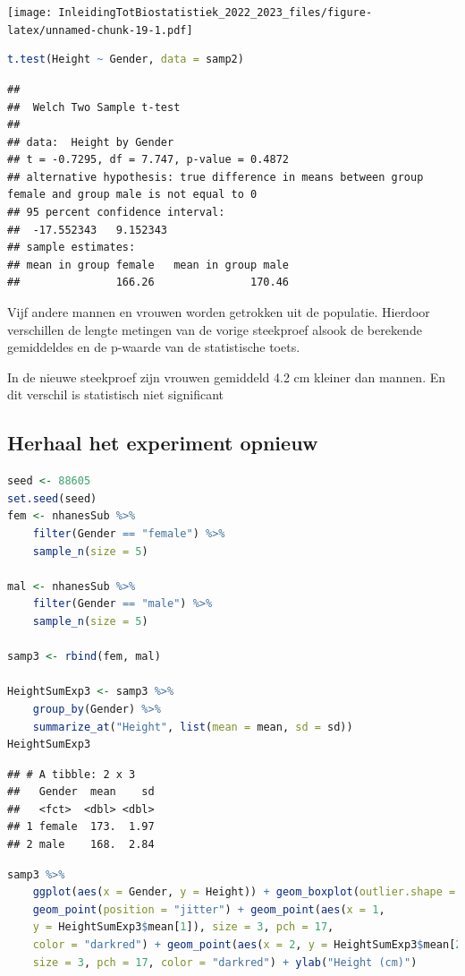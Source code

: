 \documentclass[
  12pt,dutch,coursenotes]{book}
\begin{document}
\texttt{[image: InleidingTotBiostatistiek\_2022\_2023\_files/figure-latex/unnamed-chunk-19-1.pdf]}

\begin{lstlisting}[language=R]
t.test(Height ~ Gender, data = samp2)
\end{lstlisting}

\begin{lstlisting}
## 
##  Welch Two Sample t-test
## 
## data:  Height by Gender
## t = -0.7295, df = 7.747, p-value = 0.4872
## alternative hypothesis: true difference in means between group female and group male is not equal to 0
## 95 percent confidence interval:
##  -17.552343   9.152343
## sample estimates:
## mean in group female   mean in group male 
##               166.26               170.46
\end{lstlisting}

Vijf andere mannen en vrouwen worden getrokken uit de populatie. Hierdoor verschillen de lengte metingen van de vorige steekproef alsook de berekende gemiddeldes en de p-waarde van de statistische toets.

In de nieuwe steekproef zijn vrouwen gemiddeld 4.2 cm kleiner dan mannen. En dit verschil is statistisch niet significant

\hypertarget{herhaal-het-experiment-opnieuw}{%
\subsection{Herhaal het experiment opnieuw}\label{herhaal-het-experiment-opnieuw}}

\begin{lstlisting}[language=R]
seed <- 88605
set.seed(seed)
fem <- nhanesSub %>%
    filter(Gender == "female") %>%
    sample_n(size = 5)

mal <- nhanesSub %>%
    filter(Gender == "male") %>%
    sample_n(size = 5)

samp3 <- rbind(fem, mal)

HeightSumExp3 <- samp3 %>%
    group_by(Gender) %>%
    summarize_at("Height", list(mean = mean, sd = sd))
HeightSumExp3
\end{lstlisting}

\begin{lstlisting}
## # A tibble: 2 x 3
##   Gender  mean    sd
##   <fct>  <dbl> <dbl>
## 1 female  173.  1.97
## 2 male    168.  2.84
\end{lstlisting}

\begin{lstlisting}[language=R]
samp3 %>%
    ggplot(aes(x = Gender, y = Height)) + geom_boxplot(outlier.shape = NA) +
    geom_point(position = "jitter") + geom_point(aes(x = 1,
    y = HeightSumExp3$mean[1]), size = 3, pch = 17,
    color = "darkred") + geom_point(aes(x = 2, y = HeightSumExp3$mean[2]),
    size = 3, pch = 17, color = "darkred") + ylab("Height (cm)")
\end{lstlisting}
\end{document}
